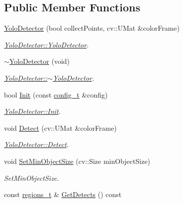 \subsection*{Public Member Functions}
\begin{DoxyCompactItemize}
\item 
\mbox{\hyperlink{class_yolo_detector_a60f435b2aa412d583038300d086255de}{Yolo\+Detector}} (bool collect\+Points, cv\+::\+U\+Mat \&color\+Frame)
\begin{DoxyCompactList}\small\item\em \mbox{\hyperlink{class_yolo_detector_a60f435b2aa412d583038300d086255de}{Yolo\+Detector\+::\+Yolo\+Detector}}. \end{DoxyCompactList}\item 
\mbox{\hyperlink{class_yolo_detector_a0ccb411c962a5ef58288f8dbc7a4b244}{$\sim$\+Yolo\+Detector}} (void)
\begin{DoxyCompactList}\small\item\em \mbox{\hyperlink{class_yolo_detector_a0ccb411c962a5ef58288f8dbc7a4b244}{Yolo\+Detector\+::$\sim$\+Yolo\+Detector}}. \end{DoxyCompactList}\item 
bool \mbox{\hyperlink{class_yolo_detector_ac518bc6743145447f19c937c345689c0}{Init}} (const \mbox{\hyperlink{defines_8h_a81d657237a541d02f8eeefdd40191920}{config\+\_\+t}} \&config)
\begin{DoxyCompactList}\small\item\em \mbox{\hyperlink{class_yolo_detector_ac518bc6743145447f19c937c345689c0}{Yolo\+Detector\+::\+Init}}. \end{DoxyCompactList}\item 
void \mbox{\hyperlink{class_yolo_detector_a4c4232e3198a50666e6b4ed9d00bf42c}{Detect}} (cv\+::\+U\+Mat \&color\+Frame)
\begin{DoxyCompactList}\small\item\em \mbox{\hyperlink{class_yolo_detector_a4c4232e3198a50666e6b4ed9d00bf42c}{Yolo\+Detector\+::\+Detect}}. \end{DoxyCompactList}\item 
void \mbox{\hyperlink{class_base_detector_ab459f4e77cf1110cc1ee84027f0f2a03}{Set\+Min\+Object\+Size}} (cv\+::\+Size min\+Object\+Size)
\begin{DoxyCompactList}\small\item\em Set\+Min\+Object\+Size. \end{DoxyCompactList}\item 
const \mbox{\hyperlink{defines_8h_a01db0de56a20f4342820a093c5154536}{regions\+\_\+t}} \& \mbox{\hyperlink{class_base_detector_a52ac4b2feed15a47de84a69eb45c233f}{Get\+Detects}} () const

\end{DoxyCompactItemize}

